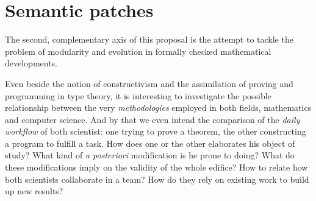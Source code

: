 \documentclass[twoside,a4paper,12pt]{article}
\begin{document}


\newpage

\section{Semantic patches}

The second, complementary axis of this proposal is the attempt to
tackle the problem of modularity and evolution in formally checked
mathematical developments.

Even beside the notion of constructivism and the assimilation of
proving and programming in type theory, it is interesting to
investigate the possible relationship between the very
\emph{methodologies} employed in both fields, mathematics and computer
science. And by that we even intend the comparison of the \emph{daily
  workflow} of both scientist: one trying to prove a theorem, the
other constructing a program to fulfill a task. How does one or the
other elaborates his object of study? What kind of \emph{a posteriori}
modification is he prone to doing? What do these modifications imply
on the validity of the whole edifice? How to relate how both
scientists collaborate in a team? How do they rely on existing work to
build up new results?
\end{document}
